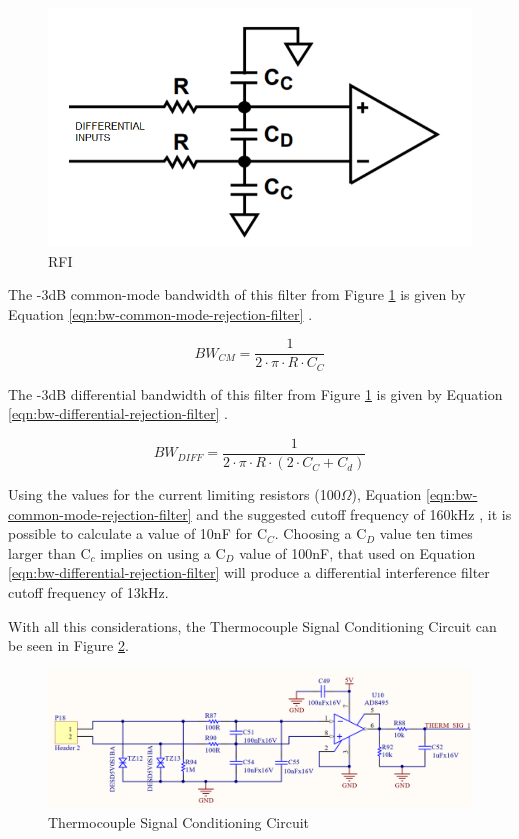 		\begin{figure}[htbp]
			\centering
				\includegraphics[width=.8\textwidth]{figuras/fig-rfi-standard-filter}
			\caption{RFI}
			\label{fig:rfi-standard-filter}
		\end{figure}

	The -3dB common-mode bandwidth of this filter from Figure \ref{fig:rfi-standard-filter} is given by Equation \ref{eqn:bw-common-mode-rejection-filter} \cite{analogDevDesignersGuide}.

		\begin{equation}\label{eqn:bw-common-mode-rejection-filter}
			BW_{CM}=\frac{1}{2 \cdot \pi \cdot R \cdot C_{C}}
		\end{equation}
	
	The -3dB differential bandwidth of this filter from Figure \ref{fig:rfi-standard-filter} is given by Equation \ref{eqn:bw-differential-rejection-filter} \cite{analogDevDesignersGuide}.
	
		\begin{equation}\label{eqn:bw-differential-rejection-filter}
			BW_{DIFF}=\frac{1}{2 \cdot \pi \cdot R \cdot \left( 2 \cdot C_{C} + C_{d} \right)}
		\end{equation}
		
	Using the values for the current limiting resistors (100$\Omega$), Equation \ref{eqn:bw-common-mode-rejection-filter} and the suggested cutoff frequency of 160kHz \cite{two-ways-thermocouple}, it is possible to calculate a value of 10nF for C$_{C}$. Choosing a C$_{D}$ value ten times larger than C$_{c}$ implies on using a C$_{D}$ value of 100nF, that used on Equation \ref{eqn:bw-differential-rejection-filter} will produce a differential interference filter cutoff frequency of 13kHz.
	\par
	With all this considerations, the Thermocouple Signal Conditioning Circuit can be seen in Figure \ref{fig:temperature-acq-cic}.

	\begin{figure}[htbp]
			\centering
				\includegraphics[width=1\textwidth]{figuras/fig-temperature-acq-cic}
			\caption{Thermocouple Signal Conditioning Circuit}
			\label{fig:temperature-acq-cic}
	\end{figure}

